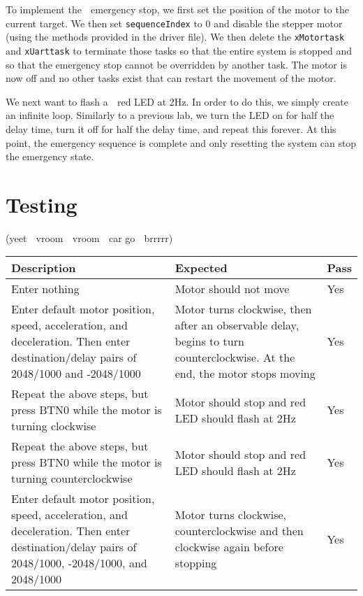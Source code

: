 \documentclass[11pt, letterpaper, titlepage]{article}
\begin{document}
To implement the 🚒 emergency stop, we first set the position of the motor to the current target. We then set \texttt{sequenceIndex} to 0 and disable the stepper motor (using the methods provided in the driver file). We then delete the \texttt{xMotortask} and \texttt{xUarttask} to terminate those tasks so that the entire system is stopped and so that the emergency stop cannot be overridden by another task. The motor is now off and no other tasks exist that can restart the movement of the motor.

We next want to flash a 🚒 red LED at 2Hz. In order to do this, we simply create an infinite loop. Similarly to a previous lab, we turn the LED on for half the delay time, turn it off for half the delay time, and repeat this forever. At this point, the emergency sequence is complete and only resetting the system can stop the emergency state.

\section{Testing}
(yeet 🚗 vroom 🚕 vroom 🚙 car go 💨 brrrrr)
\begin{tabularx}{\textwidth}{|X|X|s|}
  \caption{Tests for exercise 1 and 2.} \\
  \hline
  \textbf{Description} & \textbf{Expected} & \textbf{Pass} \\ \hline
  Enter nothing & Motor should not move & Yes \\ \hline
  Enter default motor position, speed, acceleration, and deceleration. Then enter destination/delay pairs of 2048/1000 and -2048/1000 & Motor turns clockwise, then after an observable delay, begins to turn counterclockwise. At the end, the motor stops moving & Yes \\ \hline
  Repeat the above steps, but press BTN0 while the motor is turning clockwise & Motor should stop and red LED should flash at 2Hz & Yes \\ \hline
  Repeat the above steps, but press BTN0 while the motor is turning counterclockwise & Motor should stop and red LED should flash at 2Hz & Yes \\ \hline
  Enter default motor position, speed, acceleration, and deceleration. Then enter destination/delay pairs of 2048/1000, -2048/1000, and 2048/1000 & Motor turns clockwise, counterclockwise and then clockwise again before stopping& Yes \\ \hline
\end{tabularx}
\end{document}
